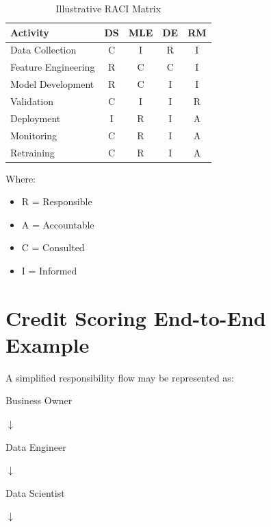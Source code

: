 \begin{table}[h]
\centering
\begin{tabular}{p{5cm}cccc}
\toprule
Activity & DS & MLE & DE & RM \\
\midrule
Data Collection & C & I & R & I \\
Feature Engineering & R & C & C & I \\
Model Development & R & C & I & I \\
Validation & C & I & I & R \\
Deployment & I & R & I & A \\
Monitoring & C & R & I & A \\
Retraining & C & R & I & A \\
\bottomrule
\end{tabular}
\caption{Illustrative RACI Matrix}
\end{table}

Where:

\begin{itemize}
    \item R = Responsible
    \item A = Accountable
    \item C = Consulted
    \item I = Informed
\end{itemize}

\section{Credit Scoring End-to-End Example}

A simplified responsibility flow may be represented as:

\begin{center}
Business Owner
\end{center}

\begin{center}
$\downarrow$
\end{center}

\begin{center}
Data Engineer
\end{center}

\begin{center}
$\downarrow$
\end{center}

\begin{center}
Data Scientist
\end{center}

\begin{center}
$\downarrow$
\end{center}

